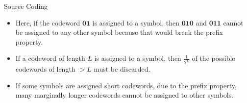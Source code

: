 \documentclass[11pt,compress,t,notes=noshow, xcolor=table]{beamer}
\begin{document}
\begin{vbframe} {Source Coding}
  \begin{itemize}
    \item Here, if the codeword $\mathbf{01}$ is assigned to a symbol, then  $\mathbf{010}$ and  $\mathbf{011}$ cannot be assigned to any other symbol because that would break the prefix property.
    \item If a codeword of length $L$ is assigned to a symbol, then $\frac{1}{2^L}$ of the possible codewords of length $> L$ must be discarded.
    \item If some symbols are assigned short codewords, due to the prefix property,  many marginally longer codewords cannot be assigned to other symbols.
  \end{itemize} 
  
\framebreak
  
  

\end{vbframe}
\end{document}
